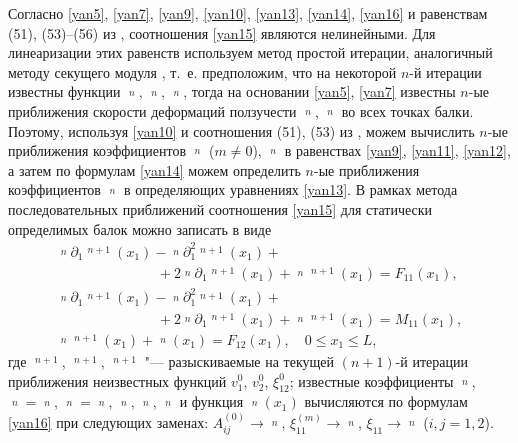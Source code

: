 Согласно \eqref{yan5}, \eqref{yan7}, \eqref{yan9}, \eqref{yan10}, \eqref{yan13}, \eqref{yan14}, \eqref{yan16} и равенствам (51), (53)--(56) из \cite{yan:bib13}, соотношения \eqref{yan15} являются нелинейными. 
Для линеаризации этих равенств используем метод простой итерации, аналогичный методу секущего модуля \cite{yan:bib4, yan:bib9, yan:bib13}, т.~е. предположим, что на некоторой $n$-й итерации известны функции $\mathop{v_1^0 }\limits^n$, $\mathop{v_2^0}\limits^n$, $\mathop{\xi_{12}^0}\limits^n$, тогда на основании \eqref{yan5}, \eqref{yan7} известны $n$-ые приближения скорости деформаций ползучести $\mathop{\xi_{11}}\limits^n$, $\mathop{\xi_{12}}\limits^n$ во всех точках балки. Поэтому, используя \eqref{yan10} и соотношения (51), (53) из \cite{yan:bib13}, можем вычислить $n$-ые приближения коэффициентов $\mathop{a_{11}^{(m)}}\limits^n$ ($m\ne0$), $\mathop{a_{ij}^{(0)}}\limits^n$ в равенствах \eqref{yan9}, \eqref{yan11}, \eqref{yan12}, а затем по формулам \eqref{yan14} можем определить $n$-ые приближения коэффициентов $\mathop{A_{ij}^{(0)}}\limits^n$ в определяющих уравнениях \eqref{yan13}. В рамках метода последовательных приближений соотношения \eqref{yan15} для статически определимых балок можно записать в виде
\begin{equation}
\label{yan19}
\begin{array}{l}
\mathop{A_{11}}\limits^n\partial_1\mathop{v_1^0}\limits^{n+1}(x_1)-\mathop{B_{11}}\limits^n\partial_1^2\mathop{v_2^0}\limits^{n+1}(x_1)+
\\
\hspace{3cm}+ 2\mathop{C_{11}}\limits^n\partial_1\mathop{\xi_{12}^0}\limits^{n+1}(x_1)+\mathop{F_{11}^0}\limits^n\mathop{\xi_{12}^0}\limits^{n+1}(x_1)=F_{11}(x_1), 
\\ 
\mathop{B_{11}}\limits^n\partial_1\mathop{v_1^0}\limits^{n+1}(x_1)-\mathop{D_{11}}\limits^n\partial_1^2\mathop{v_2^0}\limits^{n+1}(x_1)+
\\
\hspace{3cm}+ 
2\mathop{E_{11}}\limits^n\partial_1\mathop{\xi_{12}^0}\limits^{n+1}(x_1)+\mathop{M_{11}^0}\limits^n\mathop{\xi_{12}^0}\limits^{n+1}(x_1)=M_{11}(x_1), 
\\ 
\mathop{A_{55}}\limits^n\mathop{\xi_{12}^0}\limits^{n+1}(x_1)+\mathop{F_{12}^0}\limits^n(x_1)=F_{12}(x_1),\quad 0\le x_1\le L, 
\end{array}
\end{equation}
где $\mathop{v_1^0}\limits^{n+1}$, $\mathop{v_2^0}\limits^{n+1}$, $\mathop{\xi_{12}^0}\limits^{n+1}$ "--- разыскиваемые на текущей $(n+1)$-й итерации приближения неизвестных функций $v_1^0$, $v_2^0$, $\xi_{12}^0$; известные коэффициенты $\mathop{A_{11}}\limits^n$, $\mathop{B_{11}}\limits^n=\mathop{C_{11}}\limits^n$, $\mathop{D_{11}}\limits^n=\mathop{E_{11}}\limits^n$, $\mathop{A_{55}}\limits^n$, $\mathop{F_{11}^0}\limits^n$, $\mathop{M_{11}^0}\limits^n$ и функция $\mathop{F_{12}^0}\limits^n(x_1)$ вычисляются по формулам \eqref{yan16} при следующих заменах: $A_{ij}^{(0)}\to\mathop{A_{ij}^{(0)}}\limits^n$, $\xi_{11}^{(m)}\to\mathop{\xi_{11}^{(m)}}\limits^n$, $\xi_{11}\to\mathop{\xi_{11}}\limits^n$ ($i,j=1, 2$).

